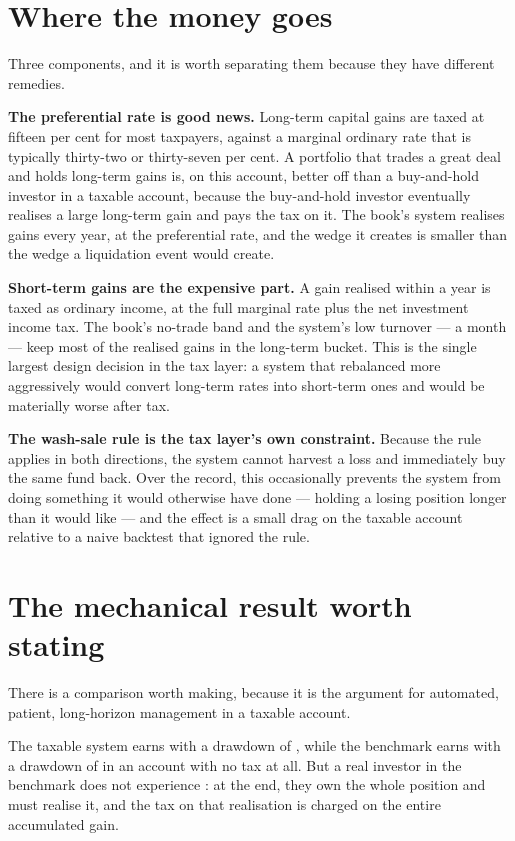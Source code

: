 \section{Where the money goes}

Three components, and it is worth separating them because they have
different remedies.

\textbf{The preferential rate is good news.} Long-term capital gains are
taxed at fifteen per cent for most taxpayers, against a marginal ordinary
rate that is typically thirty-two or thirty-seven per cent. A portfolio
that trades a great deal and holds long-term gains is, on this account,
better off than a buy-and-hold investor in a taxable account, because the
buy-and-hold investor eventually realises a large long-term gain and pays
the tax on it. The book's system realises gains every year, at the
preferential rate, and the wedge it creates is smaller than the wedge a
liquidation event would create.

\textbf{Short-term gains are the expensive part.} A gain realised within a
year is taxed as ordinary income, at the full marginal rate plus the net
investment income tax. The book's no-trade band and the system's low
turnover --- \numTurnover{} a month --- keep most of the realised gains in
the long-term bucket. This is the single largest design decision in the
tax layer: a system that rebalanced more aggressively would convert
long-term rates into short-term ones and would be materially worse after
tax.

\textbf{The wash-sale rule is the tax layer's own constraint.} Because
the rule applies in both directions, the system cannot harvest a loss and
immediately buy the same fund back. Over the record, this occasionally
prevents the system from doing something it would otherwise have done ---
holding a losing position longer than it would like --- and the effect is
a small drag on the taxable account relative to a naive backtest that
ignored the rule.

\section{The mechanical result worth stating}

There is a comparison worth making, because it is the argument for
automated, patient, long-horizon management in a taxable account.

The taxable system earns \numTaxCAGR{} with a drawdown of \numTaxDD{},
while the benchmark earns \numSpyCAGR{} with a drawdown of \numSpyDD{} in
an account with no tax at all. But a real investor in the benchmark does
not experience \numSpyCAGR{}: at the end, they own the whole position and
must realise it, and the tax on that realisation is charged on the
entire accumulated gain.

